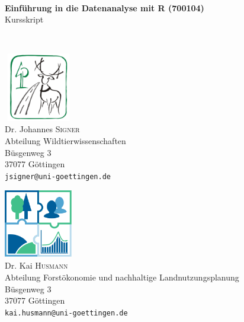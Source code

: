\begin{titlepage}
\begin{center}


\HRule \\[0.4cm]
{ \huge \bfseries Einführung in die Datenanalyse mit R (700104)}\\[0.4cm]
{\Large Kursskript}

\HRule \\[1.5cm]

\begin{minipage}{0.35\textwidth}
\begin{flushleft}
\includegraphics[width=3cm,height=3cm]{misc/fig/logo_wildtierw1.png}
~\\[0.4cm]
Dr. Johannes \textsc{Signer} \\
Abteilung Wildtierwissenschaften \\
Büsgenweg 3 \\
37077 Göttingen \\[0.5cm]
\vfill
\texttt{jsigner@uni-goettingen.de}
\end{flushleft}
\end{minipage}
\hfill
\begin{minipage}{0.60\textwidth}
\begin{flushright}
\includegraphics[width=3cm,height=3cm]{misc/fig/logo_felap.png}
~\\[0.4cm]
Dr. Kai \textsc{Husmann} \\
Abteilung Forstökonomie und nachhaltige Landnutzungsplanung \\
Büsgenweg 3 \\
37077 Göttingen \\[0.5cm]
\vfill
\texttt{kai.husmann@uni-goettingen.de}
\end{flushright}
\end{minipage}



\end{center}
\end{titlepage}
